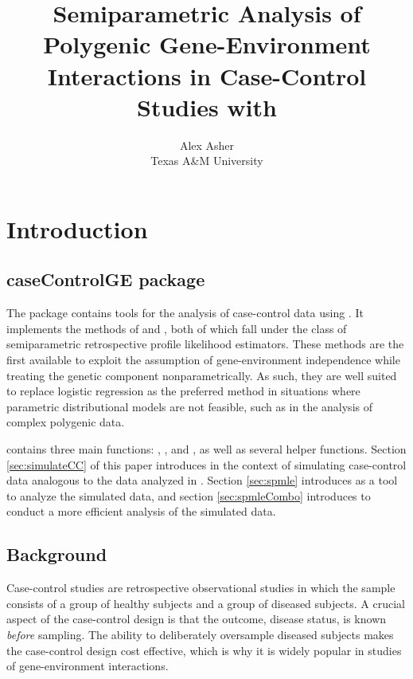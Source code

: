 \documentclass[nojss]{jss}
\author{
Alex Asher\\Texas A\&M University
}
\title{Semiparametric Analysis of Polygenic Gene-Environment Interactions in
Case-Control Studies with \pkg{caseControlGE}}
\begin{document}
\begin{titlepage}
\end{titlepage}

\def\bbeta{\mbox{\boldmath $\beta$}} \def\pr{\hbox{pr}}
\def\E{{\mathbf E}}

\section{Introduction}

\subsection{caseControlGE package}

The  package \citep{Asher2018R} contains tools for
the analysis of case-control data using  \citep{R2018}. It
implements the methods of \citet{Stalder2017} and
\citet{Wang2018unpublished}, both of which fall under the class of
semiparametric retrospective profile likelihood estimators. These
methods are the first available to exploit the assumption of
gene-environment independence while treating the genetic component
nonparametrically. As such, they are well suited to replace logistic
regression as the preferred method in situations where parametric
distributional models are not feasible, such as in the analysis of
complex polygenic data.

 contains three main functions: ,
, and , as well as several helper
functions. Section \ref{sec:simulateCC} of this paper introduces
 in the context of simulating case-control data
analogous to the data analyzed in \cite{Wang2018unpublished}. Section
\ref{sec:spmle} introduces  as a tool to analyze the
simulated data, and section \ref{sec:spmleCombo} introduces
 to conduct a more efficient analysis of the simulated
data.

\subsection{Background}

Case-control studies are retrospective observational studies in which
the sample consists of a group of healthy subjects and a group of
diseased subjects. A crucial aspect of the case-control design is that
the outcome, disease status, is known \emph{before} sampling. The
ability to deliberately oversample diseased subjects makes the
case-control design cost effective, which is why it is widely popular in
studies of gene-environment interactions.
\end{document}
